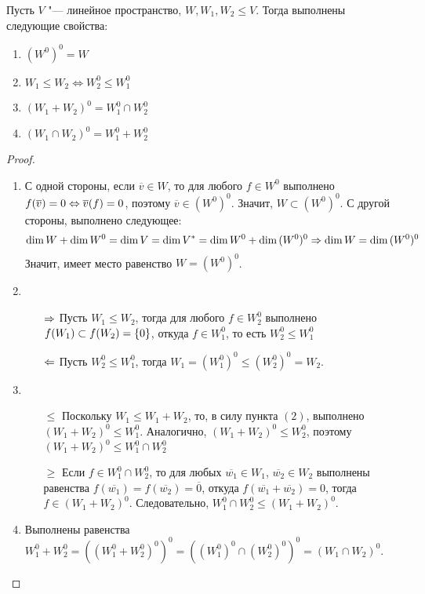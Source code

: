     \begin{theorem}
    	Пусть $V$ "--- линейное пространство, $W, W_1, W_2 \le V$. Тогда выполнены следующие свойства:
    	\begin{enumerate}
    		\item $(W^0)^0 = W$
    		\item $W_1 \le W_2 \Leftrightarrow W_2^0 \le W_1^0$
    		\item $(W_1 + W_2)^0 = W_1^0 \cap W_2^0$
    		\item $(W_1 \cap W_2)^0 = W_1^0 + W_2^0$
    	\end{enumerate}
    \end{theorem}
    
    \begin{proof}~
    	\begin{enumerate}
    		\item С одной стороны, если $\overline{v} \in W$, то для любого $f \in W^0$ выполнено $f(\overline{v}) = 0 \Leftrightarrow \overline{v}(f) = 0$, поэтому $\overline{v} \in (W^0)^0$. Значит, $W \subset (W^0)^0$. С другой стороны, выполнено следующее:
    		\[\dim{W} + \dim{W^0} \hm{=} \dim{V} = \dim{V^*} = \dim{W^0} + \dim{(W^0)^0} \ra \dim{W} = \dim{(W^0)^0}\]
    		Значит, имеет место равенство $W = (W^0)^0$.
    		
    		\item
    		\begin{itemize}
    			\item[$\Rightarrow$] Пусть $W_1 \le W_2$, тогда для любого $f \in W_2^0$ выполнено $f(W_1) \hm{\subset} f(W_2) = \{0\}$, откуда $f \in W_1^0$, то есть $W_2^0 \le W_1^0$
    			\item[$\Leftarrow$] Пусть $W_2^0 \le W_1^0$, тогда $W_1 = (W_1^0 )^0 \le (W_2^0)^0 = W_2$.
    		\end{itemize}
    	
    		\item
    		\begin{itemize}
    			\item[$\le$] Поскольку $W_1 \le W_1 + W_2$, то, в силу пункта $(2)$, выполнено $(W_1 + W_2)^0 \le W_1^0$. Аналогично, $(W_1 + W_2)^0 \le W_2^0$, поэтому $(W_1 + W_2)^0 \le W_1^0 \cap W_2^0$
    			\item[$\ge$] Если $f \in W_1^0 \cap W_2^0$, то для любых $\overline{w_1} \in W_1$, $\overline{w_2} \in W_2$ выполнены равенства $f(\overline{w_1}) = f(\overline{w_2}) = \overline{0}$, откуда $f(\overline{w_1} + \overline{w_2}) = 0$, тогда $f \in (W_1 + W_2)^0$. Следовательно, $W_1^0 \cap W_2^0 \le (W_1 + W_2)^0$.
    		\end{itemize}
    	
    		\item Выполнены равенства $W_1^0 + W_2^0 = ((W_1^0 + W_2^0)^0)^0 = ((W_1^0)^0 \cap (W_2^0)^0)^0 = (W_1 \cap W_2)^0$.\qedhere
    	\end{enumerate}
    \end{proof}